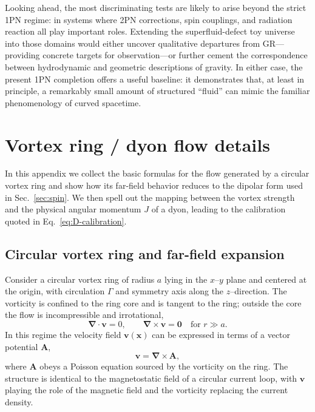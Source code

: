 \documentclass[11pt]{article}
\begin{document}
Looking ahead, the most discriminating tests are likely to arise
beyond the strict 1PN regime: in systems where 2PN corrections, spin
couplings, and radiation reaction all play important roles.
Extending the superfluid-defect toy universe into those domains would
either uncover qualitative departures from GR---providing concrete
targets for observation---or further cement the correspondence
between hydrodynamic and geometric descriptions of gravity.
In either case, the present 1PN completion offers a useful baseline:
it demonstrates that, at least in principle, a remarkably small
amount of structured ``fluid'' can mimic the familiar phenomenology
of curved spacetime.

\appendix

\section{Vortex ring / dyon flow details}
\label{app:dyon-flow}

In this appendix we collect the basic formulas for the flow generated
by a circular vortex ring and show how its far-field behavior reduces
to the dipolar form used in Sec.~\ref{sec:spin}.  We then spell out
the mapping between the vortex strength and the physical angular
momentum $J$ of a dyon, leading to the calibration quoted in
Eq.~\eqref{eq:D-calibration}.

\subsection{Circular vortex ring and far-field expansion}

Consider a circular vortex ring of radius $a$ lying in the
$x$--$y$ plane and centered at the origin, with circulation $\Gamma$
and symmetry axis along the $z$–direction.
The vorticity is confined to the ring core and is tangent to the
ring; outside the core the flow is incompressible and irrotational,
\begin{equation}
  \bm{\nabla}\cdot\mathbf{v} = 0,
  \qquad
  \bm{\nabla}\times\mathbf{v} = \mathbf{0}
  \quad\text{for } r \gg a.
\end{equation}
In this regime the velocity field $\mathbf{v}(\mathbf{x})$ can be
expressed in terms of a vector potential $\mathbf{A}$,
\begin{equation}
  \mathbf{v} = \bm{\nabla}\times\mathbf{A},
\end{equation}
where $\mathbf{A}$ obeys a Poisson equation sourced by the vorticity
on the ring.
The structure is identical to the magnetostatic field of a circular
current loop, with $\mathbf{v}$ playing the role of the magnetic
field and the vorticity replacing the current density.
\end{document}
